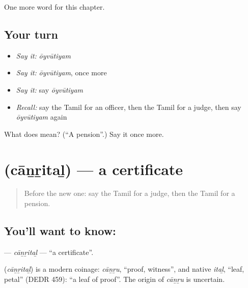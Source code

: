 \begin{grammarlens}[title={What you've built}]
One more word for this chapter.
\end{grammarlens}

\subsection*{Your turn}
\begin{itemize}
\raggedright
  \item \emph{Say it:} \emph{ōyvūtiyam}
  \item \emph{Say it:} \emph{ōyvūtiyam}, once more
  \item \emph{Say it:} say \emph{ōyvūtiyam}
  \item \emph{Recall:} say the Tamil for an officer, then the Tamil for a judge, then say \emph{ōyvūtiyam} again
\end{itemize}

\begin{tcolorbox}[breakable,colback=teal!4,colframe=teal!35!black,title={Before you move on}]
What does  mean? (\textquotedblleft{}A pension\textquotedblright{}.) Say it once more.
\end{tcolorbox}
\section[\texorpdfstring{\ta{சான்றிதழ்} (cāṉṟitaḻ)}{சான்றிதழ் (cāṉṟitaḻ)}]{ (cāṉṟitaḻ) — a certificate}

\label{lesson:TA-C253-canrital}



\begin{quote}
Before the new one: say the Tamil for a judge, then the Tamil for a pension.
\end{quote}

\subsection*{You'll want to know: }
\textbf{} — \emph{cāṉṟitaḻ} — \textquotedblleft{}a certificate\textquotedblright{}.

\begin{cousinweb}
\textbf{} (\emph{cāṉṟitaḻ}) is a modern coinage: \emph{cāṉṟu}, \textquotedblleft{}proof, witness\textquotedblright{}, and native \emph{itaḻ}, \textquotedblleft{}leaf, petal\textquotedblright{} (DEDR 459): \textquotedblleft{}a leaf of proof\textquotedblright{}. The origin of \emph{cāṉṟu} is uncertain.
\end{cousinweb}

